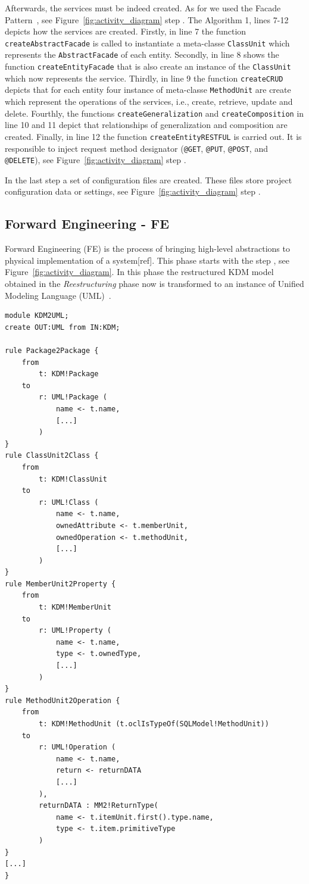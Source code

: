 \documentclass[a4paper,twoside]{article}
\newcommand*\circled[1]{\tikz[baseline=(char.base)]{
  \node[shape=circle,draw, inner sep=0.1pt] (char) {#1};}
}
\begin{document}
Afterwards, the services must be indeed created. As for we used the Facade Pattern~\cite{Gamma1994}, see Figure~\ref{fig:activity_diagram} step \circled{\textbf{H}}. The Algorithm 1, lines 7-12 depicts how the services are created. Firstly, in line 7 the function \texttt{createAbstractFacade} is called to instantiate a meta-classe \texttt{ClassUnit} which represents the \texttt{AbstractFacade} of each entity. Secondly, in line 8 shows the function \texttt{createEntityFacade} that is also create an instance of the \texttt{ClassUnit} which now represents the service. Thirdly, in line 9 the function \texttt{createCRUD} depicts that for each entity four instance of meta-classe \texttt{MethodUnit} are create which represent the operations of the services, i.e., create, retrieve, update and delete. Fourthly, the functions \texttt{createGeneralization} and \texttt{createComposition} in line 10 and 11 depict that relationships of generalization and composition are created. Finally, in line 12 the function \texttt{createEntityRESTFUL} is carried out. It is responsible to inject request method designator (\texttt{@GET}, \texttt{@PUT}, \texttt{@POST}, and \texttt{@DELETE}), see Figure~\ref{fig:activity_diagram} step \circled{\textbf{I}}.

In the last step a set of configuration files are created. These files store project configuration data or settings, see Figure~\ref{fig:activity_diagram} step \circled{\textbf{J}}.

\subsection{Forward Engineering - FE} %
\label{sub:forward_engineering}

Forward Engineering (FE) is the process of bringing high-level abstractions to physical implementation of a system[ref]. This phase starts with the step \circled{\textbf{K}}, see Figure~\ref{fig:activity_diagram}. In this phase the restructured KDM model obtained in the \textit{Reestructuring} phase now is transformed to an instance of Unified Modeling Language (UML)~\cite{OMG}. 

\begin{lstlisting}[caption=Chunk of KDM2UML, label=list:KDM2UML, frame=lrtb, basicstyle=\tiny]
module KDM2UML;
create OUT:UML from IN:KDM;

rule Package2Package {
	from 
		t: KDM!Package
	to
		r: UML!Package (	
			name <- t.name,
			[...]
		)
}
rule ClassUnit2Class {
	from
		t: KDM!ClassUnit
	to
		r: UML!Class (
			name <- t.name,
			ownedAttribute <- t.memberUnit,
			ownedOperation <- t.methodUnit,
			[...]
		)
}
rule MemberUnit2Property {
	from
		t: KDM!MemberUnit
	to
		r: UML!Property (
			name <- t.name,
			type <- t.ownedType,
			[...]
		)
}
rule MethodUnit2Operation {	
	from
		t: KDM!MethodUnit (t.oclIsTypeOf(SQLModel!MethodUnit))
	to
		r: UML!Operation (
			name <- t.name,
			return <- returnDATA
			[...]
		),
		returnDATA : MM2!ReturnType(
			name <- t.itemUnit.first().type.name,
			type <- t.item.primitiveType
		)
}
[...]
}
\end{lstlisting}
\end{document}
